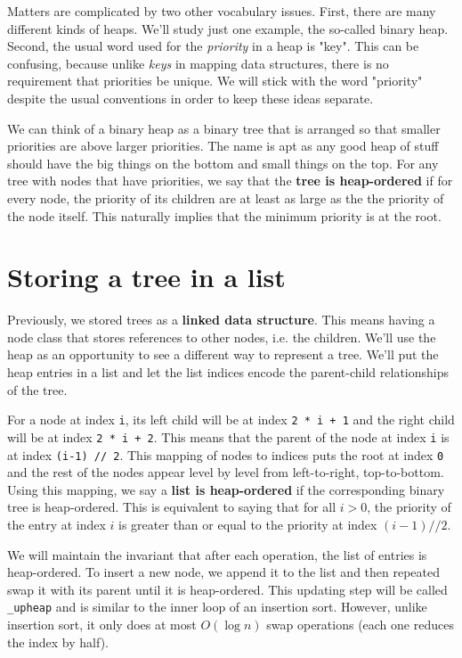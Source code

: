 Matters are complicated by two other vocabulary issues.  First, there are many different kinds of heaps.  We'll study just one example, the so-called binary heap.  Second, the usual word used for the \emph{priority} in a heap is "key".  This can be confusing, because unlike \emph{keys} in mapping data structures, there is no requirement that priorities be unique.  We will stick with the word "priority" despite the usual conventions in order to keep these ideas separate.


We can think of a binary heap as a binary tree that is arranged so that smaller priorities are above larger priorities.  The name is apt as any good heap of stuff should have the big things on the bottom and small things on the top.  For any tree with nodes that have priorities, we say that the \textbf{tree is heap-ordered} if for every node, the priority of its children are at least as large as the the priority of the node itself.  This naturally implies that the minimum priority is at the root.

\section{Storing a tree in a list}


Previously, we stored trees as a \textbf{linked data structure}.  This means having a node class that stores references to other nodes, i.e. the children.  We'll use the heap as an opportunity to see a different way to represent a tree.  We'll put the heap entries in a list and let the list indices encode the parent-child relationships of the tree.


For a node at index \texttt{i}, its left child will be at index \texttt{2 * i + 1} and the right child will be at index \texttt{2 * i + 2}.  This means that the parent of the node at index \texttt{i} is at index \texttt{(i-1) // 2}.  This mapping of nodes to indices puts the root at index \texttt{0} and the rest of the nodes appear level by level from left-to-right, top-to-bottom.  Using this mapping, we say a \textbf{list is heap-ordered} if the corresponding binary tree is heap-ordered.  This is equivalent to saying that for all $i > 0$, the priority of the entry at index $i$ is greater than or equal to the priority at index $(i-1) // 2$.


We will maintain the invariant that after each operation, the list of entries is heap-ordered.  To insert a new node, we append it to the list and then repeated swap it with its parent until it is heap-ordered.  This updating step will be called \texttt{\_upheap} and is similar to the inner loop of an insertion sort.  However, unlike insertion sort, it only does at most $O(\log n)$ swap operations (each one reduces the index by half).


